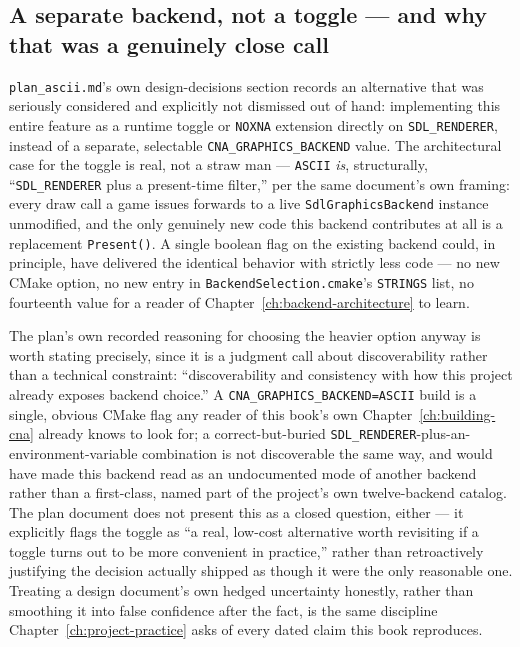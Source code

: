 \subsection{A separate backend, not a toggle --- and why that was a genuinely close call}

\texttt{plan\_ascii.md}'s own design-decisions section records an alternative that was seriously
considered and explicitly not dismissed out of hand: implementing this entire feature as a
runtime toggle or \texttt{NOXNA} extension directly on \texttt{SDL\_RENDERER}, instead of a
separate, selectable \texttt{CNA\_GRAPHICS\_BACKEND} value. The architectural case for the
toggle is real, not a straw man --- \texttt{ASCII} \emph{is}, structurally, ``\texttt{SDL\_RENDERER}
plus a present-time filter,'' per the same document's own framing: every draw call a game issues
forwards to a live \texttt{SdlGraphicsBackend} instance unmodified, and the only genuinely new
code this backend contributes at all is a replacement \texttt{Present()}. A single boolean flag
on the existing backend could, in principle, have delivered the identical behavior with strictly
less code --- no new CMake option, no new entry in \texttt{BackendSelection.cmake}'s
\texttt{STRINGS} list, no fourteenth value for a reader of Chapter~\ref{ch:backend-architecture}
to learn.

The plan's own recorded reasoning for choosing the heavier option anyway is worth stating
precisely, since it is a judgment call about discoverability rather than a technical constraint:
``discoverability and consistency with how this project already exposes backend choice.'' A
\texttt{CNA\_GRAPHICS\_BACKEND=ASCII} build is a single, obvious CMake flag any reader of this
book's own Chapter~\ref{ch:building-cna} already knows to look for; a correct-but-buried
\texttt{SDL\_RENDERER}-plus-an-environment-variable combination is not discoverable the same
way, and would have made this backend read as an undocumented mode of another backend rather
than a first-class, named part of the project's own twelve-backend catalog. The plan document
does not present this as a closed question, either --- it explicitly flags the toggle as ``a
real, low-cost alternative worth revisiting if a toggle turns out to be more convenient in
practice,'' rather than retroactively justifying the decision actually shipped as though it were
the only reasonable one. Treating a design document's own hedged uncertainty honestly, rather
than smoothing it into false confidence after the fact, is the same discipline
Chapter~\ref{ch:project-practice} asks of every dated claim this book reproduces.

